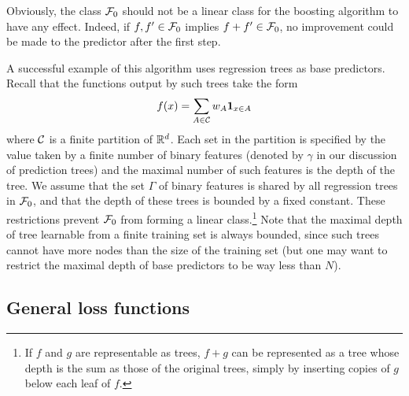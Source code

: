 \begin{remark}
Obviously, the class ${\mathcal F}_0$ should not be a linear class for the boosting algorithm to have any effect. Indeed, if $f,f'\in{\mathcal F}_0$ implies $f+f'\in{\mathcal F}_0$, no improvement could be made to the predictor after the first step. 
\end{remark}



A successful example of this algorithm uses regression trees as base predictors. Recall that the functions 
output by such trees take the form
\[
f(x) = \sum_{A \in {\mathcal C}} w_A {\bm 1}_{x\in A}
\]
where ${\mathcal C}$ is a finite partition of ${\mathbb{R}}^d$. Each set in the partition is specified by the value taken by a finite number of binary features (denoted by $\gamma$ in our discussion of prediction trees)  and the maximal number of such features is the depth of the tree. We assume that the set $\Gamma$ of binary features is shared by all regression trees in ${\mathcal F}_0$, and that the depth of these trees is bounded by a fixed constant. These restrictions prevent ${\mathcal F}_0$ from forming a linear class.\footnote{If $f$ and $g$ are representable as trees, $f+g$ can be represented as a tree whose depth is the sum as those of the original trees,  simply by inserting copies of $g$ below each leaf of $f$.} Note that the maximal depth of tree learnable from a finite training set is always bounded, since such trees cannot have more nodes than the size of the training set (but one may want to restrict the maximal depth of base predictors to be way less than $N$).


\subsection{General loss functions}

